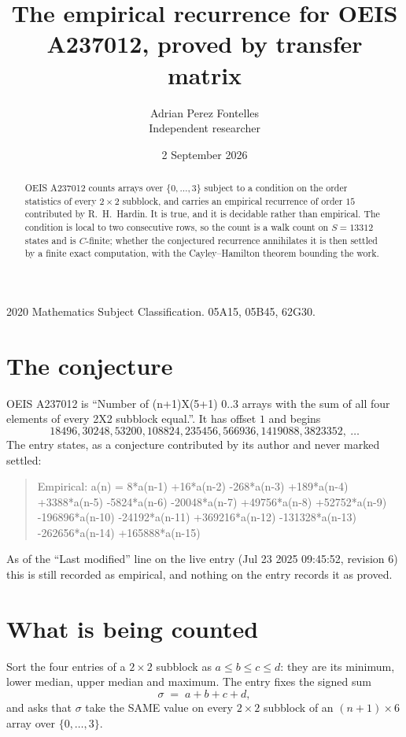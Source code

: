 \documentclass[11pt,a4paper]{article}
\title{The empirical recurrence for OEIS A237012, proved by transfer matrix}
\author{Adrian Perez Fontelles\\ \small Independent researcher}
\date{2 September 2026}
\theoremstyle{plain}
\theoremstyle{definition}
\begin{document}
\maketitle

\begin{abstract}
OEIS A237012 counts arrays over $\{0,\dots,3\}$ subject to a condition on the order
statistics of every $2\times2$ subblock, and carries an empirical recurrence of order
$15$ contributed by R.~H.~Hardin. It is true, and it is decidable rather than empirical.
The condition is local to two consecutive rows, so the count is a walk count on $S=13312$
states and is $C$-finite; whether the conjectured recurrence annihilates it is then settled by
a finite exact computation, with the Cayley--Hamilton theorem bounding the work.
\end{abstract}

\noindent\small 2020 Mathematics Subject Classification. 05A15, 05B45, 62G30.\normalsize

\section{The conjecture}

OEIS A237012 is ``Number of (n+1)X(5+1) 0..3 arrays with the sum of all four elements of every 2X2 subblock equal.''. It has offset $1$ and begins
\[
18496, 30248, 53200, 108824, 235456, 566936, 1419088, 3823352,\ \dots
\]
The entry states, as a conjecture contributed by its author and never marked settled:
\begin{quote}
Empirical: a(n) = 8*a(n-1) +16*a(n-2) -268*a(n-3) +189*a(n-4) +3388*a(n-5) -5824*a(n-6) -20048*a(n-7) +49756*a(n-8) +52752*a(n-9) -196896*a(n-10) -24192*a(n-11) +369216*a(n-12) -131328*a(n-13) -262656*a(n-14) +165888*a(n-15)
\end{quote}
As of the ``Last modified'' line on the live entry (Jul 23 2025 09:45:52, revision 6) this is still
recorded as empirical, and nothing on the entry records it as proved.

\section{What is being counted}

Sort the four entries of a $2\times2$ subblock as $a\le b\le c\le d$: they
are its minimum, lower median, upper median and maximum. The entry fixes the signed sum
\[
\sigma\;=\;a+b+c+d,
\]
and asks that $\sigma$ take the SAME value on every $2\times2$ subblock of an
$(n+1)\times6$ array over $\{0,\dots,3\}$.
\end{document}
